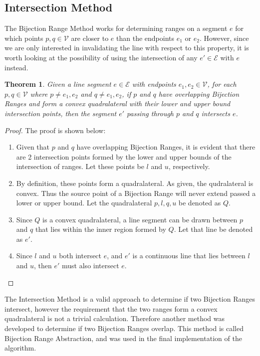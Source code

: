 \documentclass[12pt]{article}
\newtheorem{theorem}{Theorem}[section]
\begin{document}
\subsection{Intersection Method}\label{subsec:intersection-method}
The Bijection Range Method works for determining ranges on a segment $e$
for which points $p,q \in \mathcal{V}$ are closer to $e$ than
the endpoints $e_1$ or $e_2$.
However, since we are only interested
in invalidating the line with respect to this property, it is worth looking at
the possibility of using the intersection of any $e' \in \mathcal{E}$
with $e$ instead.
\begin{theorem}\label{thm:overlap}
Given a line segment $e \in \mathcal{E}$ with endpoints $e_1,e_2 \in \mathcal{V}$,
for each $p,q \in \mathcal{V}$ where $p \neq e_1,e_2$ and $q \neq e_1,e_2$,
if $p$ and $q$ have overlapping Bijection Ranges and
form a convex quadralateral with their lower and upper bound intersection points,
then the segment $e'$ passing through $p$ and $q$ intersects $e$.
\end{theorem}
\begin{proof}
The proof is shown below:
\begin{enumerate}[(1)]
\item Given that $p$ and $q$ have overlapping Bijection Ranges,
it is evident that there are 2 intersection points formed by
the lower and upper bounds of the intersection of ranges.
Let these points be $l$ and $u$, respectively.
\item By definition, these points form a quadralateral.
As given, the qudralateral is convex. Thus the source point of a Bijection Range
will never extend passed a lower or upper bound.
Let the quadralateral $p,l,q,u$ be denoted as $Q$.
\item Since $Q$ is a convex quadralateral,
a line segment can be drawn between $p$ and $q$ that lies within
the inner region formed by $Q$.
Let that line be denoted as $e'$.
\item Since $l$ and $u$ both intersect $e$, and $e'$ is a continuous line
that lies between $l$ and $u$, then $e'$ must also intersect $e$.
\end{enumerate}
\end{proof}

The Intersection Method is a valid approach to determine if two Bijection Ranges
intersect, however the requirement that the two ranges form a convex quadralateral is
not a trivial calculation. Therefore another method was developed
to determine if two Bijection Ranges overlap. This method is called
Bijection Range Abstraction, and was used in the final implementation of the algorithm.
\end{document}
